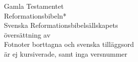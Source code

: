 \begin{center}
    {\fontsize{42}{50}\selectfont Gamla Testamentet}\\[1em]

    {\fontsize{20}{24}\selectfont  Reformationsbibeln*}\\[1em]

    {\fontsize{12}{15}\selectfont Svenska Reformationsbibelsällskapets\\[0.5em]
    översättning av}\\[1.2em]




    {\fontsize{11}{13} \selectfont *Fotnoter borttagna och svenska tilläggsord\\ är ej kursiverade, samt inga versnummer}

\end{center}